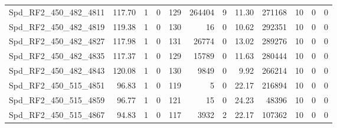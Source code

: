 \begin{longtable}[c]{@{}lrrrrrrrrrrr@{}}
Spd\_RF2\_450\_482\_4811      & 117.70                 & 1                       & 0                       & 129                    & 264404                  & 9                       & 11.30                   & 271168                   & 10                       & 0                        & 0                        \\
Spd\_RF2\_450\_482\_4819      & 119.38                 & 1                       & 0                       & 130                    & 16                      & 0                       & 10.62                   & 292351                   & 10                       & 0                        & 0                        \\
Spd\_RF2\_450\_482\_4827      & 117.98                 & 1                       & 0                       & 131                    & 26774                   & 0                       & 13.02                   & 289276                   & 10                       & 0                        & 0                        \\
Spd\_RF2\_450\_482\_4835      & 117.37                 & 1                       & 0                       & 129                    & 15789                   & 0                       & 11.63                   & 280444                   & 10                       & 0                        & 0                        \\
Spd\_RF2\_450\_482\_4843      & 120.08                 & 1                       & 0                       & 130                    & 9849                    & 0                       & 9.92                    & 266214                   & 10                       & 0                        & 0                        \\
Spd\_RF2\_450\_515\_4851      & 96.83                  & 1                       & 0                       & 119                    & 5                       & 0                       & 22.17                   & 216894                   & 10                       & 0                        & 0                        \\
Spd\_RF2\_450\_515\_4859      & 96.77                  & 1                       & 0                       & 121                    & 15                      & 0                       & 24.23                   & 48396                    & 10                       & 0                        & 0                        \\
Spd\_RF2\_450\_515\_4867      & 94.83                  & 1                       & 0                       & 117                    & 3932                    & 2                       & 22.17                   & 107362                   & 10                       & 0                        & 0                        \\

\end{longtable}
